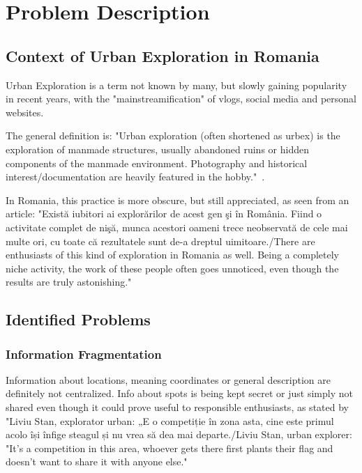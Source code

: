 \documentclass[12pt,a4paper]{report}
\begin{document}
\newpage

\chapter{Problem Description}
\section{Context of Urban Exploration in Romania}
Urban Exploration is a term not known by many, but slowly gaining popularity in recent years, with the "mainstreamification" of vlogs, social media and personal websites.

The general definition is: "Urban exploration (often shortened as urbex) is the exploration of manmade structures, usually abandoned ruins or hidden components of the manmade environment. Photography and historical interest/documentation are heavily featured in the hobby."~\cite{wikipediaUrbexDefinition}.

In Romania, this practice is more obscure, but still appreciated, as seen from an article: "Există iubitori ai explorărilor de acest gen şi în România. Fiind o activitate complet de nişă, munca acestori oameni trece neobservată de cele mai multe ori, cu toate că rezultatele sunt de-a dreptul uimitoare./There are enthusiasts of this kind of exploration in Romania as well. Being a completely niche activity, the work of these people often goes unnoticed, even though the results are truly astonishing."~\cite{articleUrbexRomania}

\section{Identified Problems}
\subsection{Information Fragmentation}
Information about locations, meaning coordinates or general description are definitely not centralized. Info about spots is being kept secret or just simply not shared even though it could prove useful to responsible enthusiasts, as stated by "Liviu Stan, explorator urban: „E o competiție în zona asta, cine este primul acolo își înfige steagul și nu vrea să dea mai departe./Liviu Stan, urban explorer: "It's a competition in this area, whoever gets there first plants their flag and doesn't want to share it with anyone else."~\cite{articleUrbexInformation}
\end{document}
